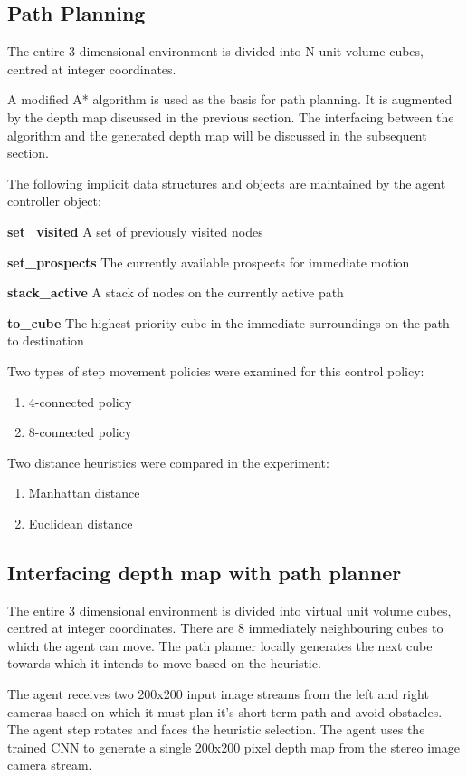 \subsection{Path Planning}
The entire 3 dimensional environment is divided into N unit volume cubes, centred at integer coordinates.
 
A modified A* algorithm is used as the basis for path planning. It is augmented by the depth map discussed in the previous section. The interfacing between the algorithm and the generated depth map will be discussed in the subsequent section.

The following implicit data structures and objects are maintained by the agent controller object:
 
\textbf{set\_visited}
A set of previously visited nodes
 
\textbf{set\_prospects}
The currently available prospects for immediate motion
 
\textbf{stack\_active}
A stack of nodes on the currently active path
 
\textbf{to\_cube}
The highest priority cube in the immediate surroundings on the path to destination

Two types of step movement policies were examined for this control policy:
\begin{enumerate}
\item 4-connected policy
\item 8-connected policy
\end{enumerate}

Two distance heuristics were compared in the experiment:
\begin{enumerate}
\item Manhattan distance
\item Euclidean distance
\end{enumerate}

\subsection{Interfacing depth map with path planner}

The entire 3 dimensional environment is divided into virtual unit volume cubes, centred at integer coordinates. There are 8 immediately neighbouring cubes to which the agent can move. The path planner locally generates the next cube towards which it intends to move based on the heuristic.

The agent receives two 200x200 input image streams from the left and right cameras based on which it must plan it's short term path and avoid obstacles. The agent step rotates and faces the heuristic selection. The agent uses the trained CNN to generate a single 200x200 pixel depth map from the stereo image camera stream.

